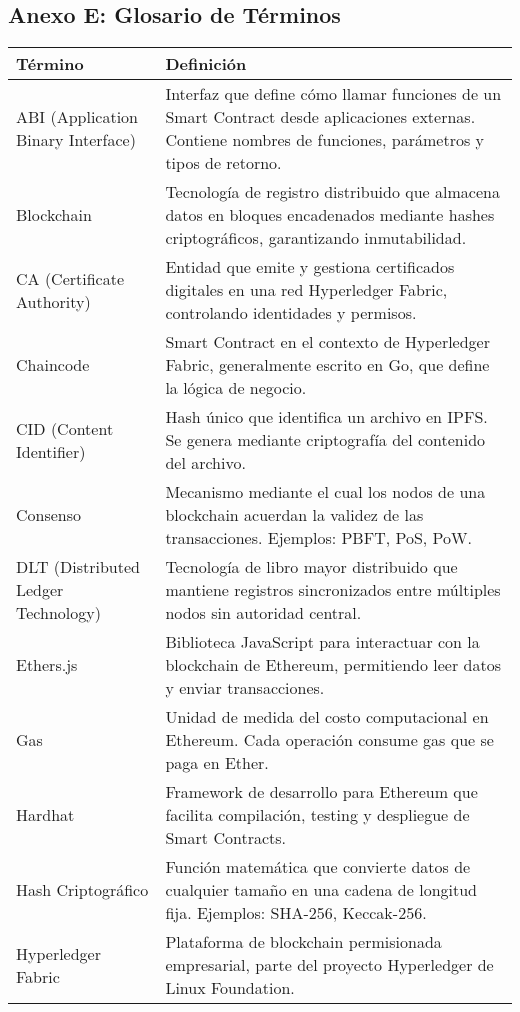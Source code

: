 \subsection{Anexo E: Glosario de Términos}

\begin{table}[h]
\centering
\small
\begin{tabular}{|p{3.5cm}|p{10.5cm}|}
\hline
\textbf{Término} & \textbf{Definición} \\ \hline
ABI (Application Binary Interface) & Interfaz que define cómo llamar funciones de un Smart Contract desde aplicaciones externas. Contiene nombres de funciones, parámetros y tipos de retorno. \\ \hline
Blockchain & Tecnología de registro distribuido que almacena datos en bloques encadenados mediante hashes criptográficos, garantizando inmutabilidad. \\ \hline
CA (Certificate Authority) & Entidad que emite y gestiona certificados digitales en una red Hyperledger Fabric, controlando identidades y permisos. \\ \hline
Chaincode & Smart Contract en el contexto de Hyperledger Fabric, generalmente escrito en Go, que define la lógica de negocio. \\ \hline
CID (Content Identifier) & Hash único que identifica un archivo en IPFS. Se genera mediante criptografía del contenido del archivo. \\ \hline
Consenso & Mecanismo mediante el cual los nodos de una blockchain acuerdan la validez de las transacciones. Ejemplos: PBFT, PoS, PoW. \\ \hline
DLT (Distributed Ledger Technology) & Tecnología de libro mayor distribuido que mantiene registros sincronizados entre múltiples nodos sin autoridad central. \\ \hline
Ethers.js & Biblioteca JavaScript para interactuar con la blockchain de Ethereum, permitiendo leer datos y enviar transacciones. \\ \hline
Gas & Unidad de medida del costo computacional en Ethereum. Cada operación consume gas que se paga en Ether. \\ \hline
Hardhat & Framework de desarrollo para Ethereum que facilita compilación, testing y despliegue de Smart Contracts. \\ \hline
Hash Criptográfico & Función matemática que convierte datos de cualquier tamaño en una cadena de longitud fija. Ejemplos: SHA-256, Keccak-256. \\ \hline
Hyperledger Fabric & Plataforma de blockchain permisionada empresarial, parte del proyecto Hyperledger de Linux Foundation. \\ \hline

\end{tabular}
\end{table}
